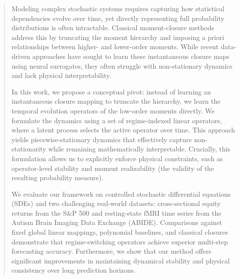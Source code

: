 \documentclass[journal, onecolumn]{IEEEtran}
\begin{document}
\maketitle
\begin{abstract}
Modeling complex stochastic systems requires capturing how statistical dependencies evolve over time, yet directly representing full probability distributions is often intractable. Classical moment-closure methods address this by truncating the moment hierarchy and imposing a priori relationships between higher- and lower-order moments. While recent data-driven approaches have sought to learn these instantaneous closure maps using neural surrogates, they often struggle with non-stationary dynamics and lack physical interpretability.

In this work, we propose a conceptual pivot: instead of learning an instantaneous closure mapping to truncate the hierarchy, we learn the temporal evolution operators of the low-order moments directly. We formulate the dynamics using a set of regime-indexed linear operators, where a latent process selects the active operator over time. This approach yields piecewise-stationary dynamics that effectively capture non-stationarity while remaining mathematically interpretable. Crucially, this formulation allows us to explicitly enforce physical constraints, such as operator-level stability and moment realizability (the validity of the resulting probability measure).

We evaluate our framework on controlled stochastic differential equations (SDEs) and two challenging real-world datasets: cross-sectional equity returns from the S\&P 500 and resting-state fMRI time series from the Autism Brain Imaging Data Exchange (ABIDE). Comparisons against fixed global linear mappings, polynomial baselines, and classical closures demonstrate that regime-switching operators achieve superior multi-step forecasting accuracy. Furthermore, we show that our method offers significant improvements in maintaining dynamical stability and physical consistency over long prediction horizons.

\end{abstract}



\begin{IEEEkeywords}

\end{IEEEkeywords}
\end{document}
